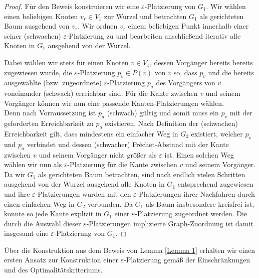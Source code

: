 \documentclass[a4paper, 12pt, twoside]{article}
\theoremstyle{Format1} %
\begin{document}
\begin{proof}
Für den Beweis konstruieren wir eine $\varepsilon$-Platzierung von $G_1$.
Wir wählen einen beliebigen Knoten $v_r \in V_1$ zur Wurzel und betrachten $G_1$ als gerichteten Baum ausgehend von $v_r$.
Wir ordnen $v_r$ einem beliebigen Punkt innerhalb einer seiner (schwachen) $\varepsilon$-Platzierung zu und bearbeiten anschließend iterativ alle
Knoten in $G_1$ ausgehend von der Wurzel.

Dabei wählen wir stets für einen Knoten $v \in V_1$, dessen Vorgänger bereits bereits zugewiesen wurde,
die $\varepsilon$-Platzierung $p_v \in P(v)$ von $v$ so, dass $p_v$
und die bereits ausgewählte (bzw. zugeordnete) $\varepsilon$-Platzierung $p_a$ des Vorgängers von $v$ voneinander (schwach) erreichbar sind.
Für die Kante zwischen $v$ und seinem Vorgänger können wir nun eine passende Kanten-Platzierungen wählen.
\\
Denn nach Vorraussetzung ist $p_a$ (schwach) gültig und somit muss ein $p_v$ mit der geforderten Erreichbarkeit zu $p_a$ existieren.
Nach Definition der (schwachen) Erreichbarkeit gilt, dass mindestens ein einfacher Weg in $G_2$ existiert, welcher $p_v$ und $p_a$ verbindet
und dessen (schwacher) Fréchet-Abstand mit der Kante zwischen $v$ und seinem Vorgänger nicht größer als $\varepsilon$ ist.
Einen solchen Weg wählen wir nun als $\varepsilon$-Platzierung für die Kante zwischen $v$ und seinem Vorgänger.
\\
Da wir $G_1$ als gerichteten Baum betrachten, sind nach endlich vielen Schritten ausgehend von der Wurzel ausgehend alle Knoten in $G_1$
entsprechend zugewiesen und ihre $\varepsilon$-Platzierungen
wurden mit den $\varepsilon$-Platzierungen ihrer Nachfahren durch einen einfachen Weg in $G_2$ verbunden.
Da $G_1$ als Baum insbesondere kreisfrei ist, konnte so jede Kante explizit in $G_1$ einer $\varepsilon$-Platzierung zugeordnet werden.
Die durch die Auswahl dieser $\varepsilon$-Platzierungen implizierte Graph-Zuordnung ist damit insgesamt eine $\varepsilon$-Platzierung von $G_1$.
\end{proof}

Über die Konstruktion aus dem Beweis von Lemma \ref{Lemma 1} erhalten wir einen ersten Ansatz zur Konstruktion einer $\varepsilon$-Platzierung gemäß der Einschränkungen und
des Optimalitätskriteriums.
\end{document}
